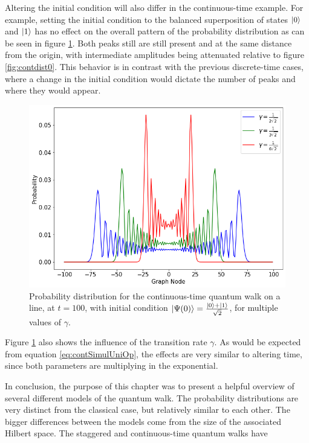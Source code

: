 \documentclass[../../dissertation.tex]{subfiles}
\begin{document}
Altering the initial condition will also differ in the
continuous-time example. For example, setting the initial condition to the
balanced superposition of states $\ket{0}$ and $\ket{1}$ has no effect on the
overall pattern of the probability distribution as can be seen in figure
\ref{fig:contdist2}. Both peaks still are still present and at the same
distance from the origin, with intermediate amplitudes being attenuated
relative to figure \ref{fig:contdist0}. This behavior is in contrast with the previous
discrete-time cases, where a change in the initial condition would dictate the
number of peaks and where they would appear.
\begin{figure}[!h]
	\centering
	\includegraphics[scale=0.40]{img/ContQuantumWalk/ctqwMultipleGammaSup.png}
	\caption{Probability distribution for the continuous-time quantum walk on a line, at $t=100$, with initial condition $\ket{\Psi(0)}=\frac{\ket{0}+\ket{1}}{\sqrt{2}}$, for multiple values of $\gamma$.} 
	\label{fig:contdist2}
\end{figure}
Figure \ref{fig:contdist2} also shows the influence of the transition rate
$\gamma$. As would be expected from equation \ref{eq:contSimulUniOp}, the
effects are very similar to altering time, since both parameters are
multiplying in the exponential.\par
In conclusion, the purpose of this chapter was to present a helpful overview of
several different models of the quantum walk. The probability distributions are
very distinct from the classical case, but relatively similar to each other.
The bigger differences between the models come from the size of the associated
Hilbert space. The staggered and continuous-time quantum walks have
\end{document}
